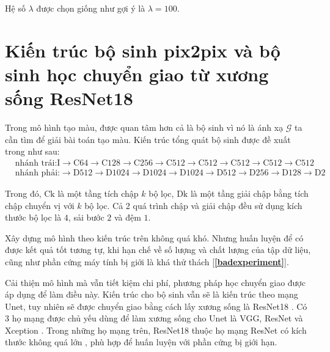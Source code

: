 \documentclass[a4paper, 12pt]{report}
\begin{document}
Hệ số $\lambda$ được chọn giống như \cite{isola2018imagetoimage} gợi ý là $\lambda = 100$.\vspace{5pt}

\section{Kiến trúc bộ sinh pix2pix và bộ sinh học chuyển giao từ xương sống ResNet18}\label{transferlearning}

Trong mô hình tạo màu, được quan tâm hơn cả là bộ sinh vì nó là ánh xạ $\mathcal{G}$ ta cần tìm để giải bài toán tạo màu.
Kiến trúc tổng quát bộ sinh được đề xuất trong \cite{isola2018imagetoimage} như sau:
\begin{align}
    &\text{nhánh trái:} \text{I} \rightarrow \text{C64} \rightarrow \text{C128} \rightarrow \text{C256} \rightarrow \text{C512} \rightarrow \text{C512} \rightarrow \text{C512} \rightarrow \text{C512} \rightarrow \text{C512}\\
    &\text{nhánh phải:} \rightarrow \text{D512} \rightarrow \text{D1024} \rightarrow \text{D1024} \rightarrow \text{D1024} \rightarrow \text{D512} \rightarrow \text{D256} \rightarrow \text{D128} \rightarrow \text{D2}
\end{align}

Trong đó, $\text{Ck}$ là một tầng tích chập $k$ bộ lọc, $\text{Dk}$ là một tầng giải chập bằng tích chập chuyển vị với $k$ bộ lọc.
Cả 2 quá trình chập và giải chập đều sử dụng kích thước bộ lọc là $4$, sải bước $2$ và đệm $1$.\vspace{5pt}

Xây dựng mô hình theo kiến trúc trên không quá khó.
Nhưng huấn luyện để có được kết quả tốt tương tự, khi hạn chế về số lượng và chất lượng của tập dữ liệu, cũng như phần cứng máy tính bị giới là khá thử thách [\textbf{\ref{badexperiment}}].\vspace{5pt}

Cải thiện mô hình mà vẫn tiết kiệm chi phí, phương pháp học chuyển giao được áp dụng để làm điều này.
Kiến trúc cho bộ sinh vẫn sẽ là kiến trúc theo mạng Unet, tuy nhiên sẽ được chuyển giao bằng cách lấy xương sống là ResNet18 \cite{christopherresunet2019}.
Có 3 họ mạng được chủ yếu dùng để làm xương sống cho Unet là VGG, ResNet và Xception \cite{backboneresnet2020}.
Trong những họ mạng trên, ResNet18 thuộc họ mạng ResNet có kích thước không quá lớn \cite{Khan_2020}, phù hợp để huấn luyện với phần cứng bị giới hạn.
\end{document}
